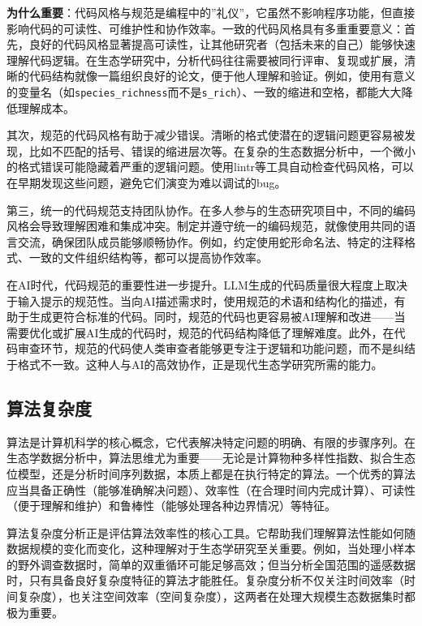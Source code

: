 \documentclass[
]{book}
\begin{document}
\textbf{为什么重要}：代码风格与规范是编程中的''礼仪''，它虽然不影响程序功能，但直接影响代码的可读性、可维护性和协作效率。一致的代码风格具有多重重要意义：首先，良好的代码风格显著提高可读性，让其他研究者（包括未来的自己）能够快速理解代码逻辑。在生态学研究中，分析代码往往需要被同行评审、复现或扩展，清晰的代码结构就像一篇组织良好的论文，便于他人理解和验证。例如，使用有意义的变量名（如\texttt{species\_richness}而不是\texttt{s\_rich}）、一致的缩进和空格，都能大大降低理解成本。

其次，规范的代码风格有助于减少错误。清晰的格式使潜在的逻辑问题更容易被发现，比如不匹配的括号、错误的缩进层次等。在复杂的生态数据分析中，一个微小的格式错误可能隐藏着严重的逻辑问题。使用lintr等工具自动检查代码风格，可以在早期发现这些问题，避免它们演变为难以调试的bug。

第三，统一的代码规范支持团队协作。在多人参与的生态研究项目中，不同的编码风格会导致理解困难和集成冲突。制定并遵守统一的编码规范，就像使用共同的语言交流，确保团队成员能够顺畅协作。例如，约定使用蛇形命名法、特定的注释格式、一致的文件组织结构等，都可以提高协作效率。

在AI时代，代码规范的重要性进一步提升。LLM生成的代码质量很大程度上取决于输入提示的规范性。当向AI描述需求时，使用规范的术语和结构化的描述，有助于生成更符合标准的代码。同时，规范的代码也更容易被AI理解和改进------当需要优化或扩展AI生成的代码时，规范的代码结构降低了理解难度。此外，在代码审查环节，规范的代码使人类审查者能够更专注于逻辑和功能问题，而不是纠结于格式不一致。这种人与AI的高效协作，正是现代生态学研究所需的能力。

\hypertarget{ux7b97ux6cd5ux590dux6742ux5ea6}{%
\subsection{算法复杂度}\label{ux7b97ux6cd5ux590dux6742ux5ea6}}

算法是计算机科学的核心概念，它代表解决特定问题的明确、有限的步骤序列。在生态学数据分析中，算法思维尤为重要------无论是计算物种多样性指数、拟合生态位模型，还是分析时间序列数据，本质上都是在执行特定的算法。一个优秀的算法应当具备正确性（能够准确解决问题）、效率性（在合理时间内完成计算）、可读性（便于理解和维护）和鲁棒性（能够处理各种边界情况）等特征。

算法复杂度分析正是评估算法效率性的核心工具。它帮助我们理解算法性能如何随数据规模的变化而变化，这种理解对于生态学研究至关重要。例如，当处理小样本的野外调查数据时，简单的双重循环可能足够高效；但当分析全国范围的遥感数据时，只有具备良好复杂度特征的算法才能胜任。复杂度分析不仅关注时间效率（时间复杂度），也关注空间效率（空间复杂度），这两者在处理大规模生态数据集时都极为重要。
\end{document}
